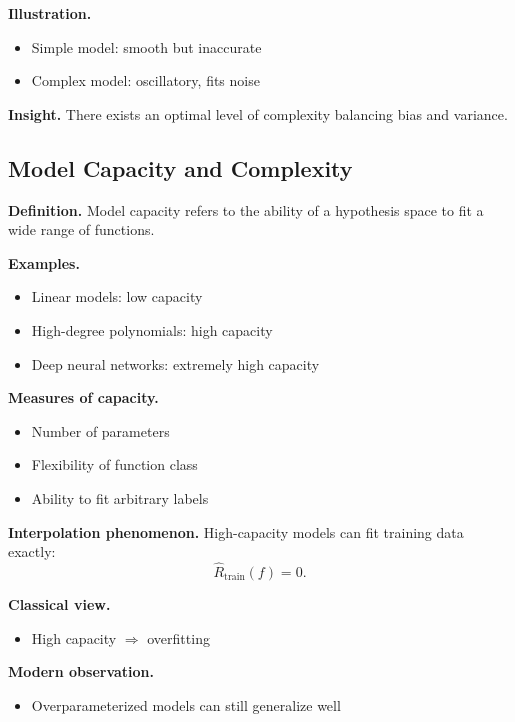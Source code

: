 \medskip

\noindent
\textbf{Illustration.}
\begin{itemize}
    \item Simple model: smooth but inaccurate
    \item Complex model: oscillatory, fits noise
\end{itemize}

\medskip

\noindent
\textbf{Insight.}  
There exists an optimal level of complexity balancing bias and variance.

\subsection{Model Capacity and Complexity}

\textbf{Definition.}  
Model capacity refers to the ability of a hypothesis space to fit a wide range of functions.

\medskip

\noindent
\textbf{Examples.}
\begin{itemize}
    \item Linear models: low capacity
    \item High-degree polynomials: high capacity
    \item Deep neural networks: extremely high capacity
\end{itemize}

\medskip

\noindent
\textbf{Measures of capacity.}
\begin{itemize}
    \item Number of parameters
    \item Flexibility of function class
    \item Ability to fit arbitrary labels
\end{itemize}

\medskip

\noindent
\textbf{Interpolation phenomenon.}  
High-capacity models can fit training data exactly:
\[
\hat{R}_{\text{train}}(f) = 0.
\]

\medskip

\noindent
\textbf{Classical view.}
\begin{itemize}
    \item High capacity $\Rightarrow$ overfitting
\end{itemize}

\medskip

\noindent
\textbf{Modern observation.}
\begin{itemize}
    \item Overparameterized models can still generalize well
\end{itemize}

